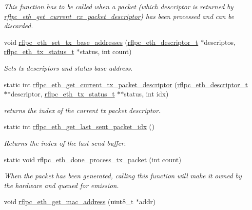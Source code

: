 \begin{DoxyCompactItemize}
\begin{DoxyCompactList}\small\item\em This function has to be called when a packet (which descriptor is returned by \hyperlink{group__eth_ga06310dadd40007da79da7f434816f64c}{rflpc\-\_\-eth\-\_\-get\-\_\-current\-\_\-rx\-\_\-packet\-\_\-descriptor}) has been processed and can be discarded. \end{DoxyCompactList}\item 
void \hyperlink{group__eth_ga582b528c504ffe38890f4c655b2084cb}{rflpc\-\_\-eth\-\_\-set\-\_\-tx\-\_\-base\-\_\-addresses} (\hyperlink{structrflpc__eth__descriptor__t}{rflpc\-\_\-eth\-\_\-descriptor\-\_\-t} $\ast$descriptos, \hyperlink{structrflpc__eth__tx__status__t}{rflpc\-\_\-eth\-\_\-tx\-\_\-status\-\_\-t} $\ast$status, int count)
\begin{DoxyCompactList}\small\item\em Sets tx descriptors and status base address. \end{DoxyCompactList}\item 
static int \hyperlink{group__eth_ga73ce91815ea1ec2faad48fdd18b1fc80}{rflpc\-\_\-eth\-\_\-get\-\_\-current\-\_\-tx\-\_\-packet\-\_\-descriptor} (\hyperlink{structrflpc__eth__descriptor__t}{rflpc\-\_\-eth\-\_\-descriptor\-\_\-t} $\ast$$\ast$descriptor, \hyperlink{structrflpc__eth__tx__status__t}{rflpc\-\_\-eth\-\_\-tx\-\_\-status\-\_\-t} $\ast$$\ast$status, int idx)
\begin{DoxyCompactList}\small\item\em returns the index of the current tx packet descriptor. \end{DoxyCompactList}\item 
static int \hyperlink{group__eth_ga70aa198cdf96cbe80c4c7c6458c5f30e}{rflpc\-\_\-eth\-\_\-get\-\_\-last\-\_\-sent\-\_\-packet\-\_\-idx} ()
\begin{DoxyCompactList}\small\item\em Returns the index of the last send buffer. \end{DoxyCompactList}\item 
static void \hyperlink{group__eth_ga537cc96b9f1332eec753bdd7a033ef52}{rflpc\-\_\-eth\-\_\-done\-\_\-process\-\_\-tx\-\_\-packet} (int count)
\begin{DoxyCompactList}\small\item\em When the packet has been generated, calling this function will make it owned by the hardware and queued for emission. \end{DoxyCompactList}\item 
\hypertarget{group__eth_ga549c1f53718d91876f0f13cf4082e2ac}{void \hyperlink{group__eth_ga549c1f53718d91876f0f13cf4082e2ac}{rflpc\-\_\-eth\-\_\-get\-\_\-mac\-\_\-address} (uint8\-\_\-t $\ast$addr)}\label{group__eth_ga549c1f53718d91876f0f13cf4082e2ac}


\end{DoxyCompactItemize}

